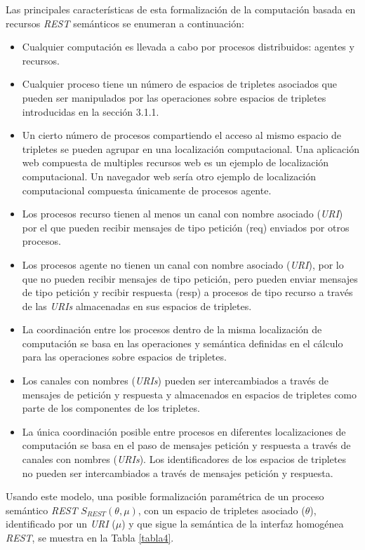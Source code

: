 Las principales caracter\'isticas de esta formalizaci\'on de la computaci\'on basada en recursos \textit{REST} sem\'anticos se enumeran a continuaci\'on:\\

\begin{itemize}
\item Cualquier computaci\'on es llevada a cabo por procesos distribuidos: agentes y recursos.
\item Cualquier proceso tiene un n\'umero de espacios de tripletes asociados que pueden ser manipulados por las operaciones sobre espacios de tripletes introducidas en la secci\'on 3.1.1.
\item Un cierto n\'umero de procesos compartiendo el acceso al mismo espacio de tripletes se pueden agrupar en una localizaci\'on computacional. Una aplicaci\'on web compuesta de multiples recursos web es un ejemplo de localizaci\'on computacional. Un navegador web ser\'ia otro ejemplo de localizaci\'on computacional compuesta \'unicamente de procesos agente.
\item Los procesos recurso tienen al menos un canal con nombre asociado (\textit{URI}) por el que pueden recibir mensajes de tipo petici\'on (req) enviados por otros procesos.
\item Los procesos agente no tienen un canal con nombre asociado (\textit{URI}), por lo que no pueden recibir mensajes de tipo petici\'on, pero pueden enviar mensajes de tipo petici\'on y recibir respuesta (resp) a procesos de tipo recurso a trav\'es de las \textit{URIs} almacenadas en sus espacios de tripletes.
\item La coordinaci\'on entre los procesos dentro de la misma localizaci\'on de computaci\'on se basa en las operaciones y sem\'antica definidas en el c\'alculo para las operaciones sobre espacios de tripletes.
\item Los canales con nombres (\textit{URIs}) pueden ser intercambiados a trav\'es de mensajes de petici\'on y respuesta y almacenados en espacios de tripletes como parte de los componentes de los tripletes.
\item La \'unica coordinaci\'on posible entre procesos en diferentes localizaciones de computaci\'on se basa en el paso de mensajes petici\'on y respuesta a trav\'es de canales con nombres (\textit{URIs}). Los identificadores de los espacios de tripletes no pueden ser intercambiados a trav\'es de mensajes petici\'on y respuesta.
\end{itemize}

Usando este modelo, una posible formalizaci\'on param\'etrica de un proceso sem\'antico \textit{REST} $S_{REST}(\theta,\mu)$, con un espacio de tripletes asociado ($\theta$), identificado por un \textit{URI} ($\mu$)  y que sigue la sem\'antica de la interfaz homog\'enea \textit{REST}, se muestra en la Tabla \ref{tabla4}.\\

